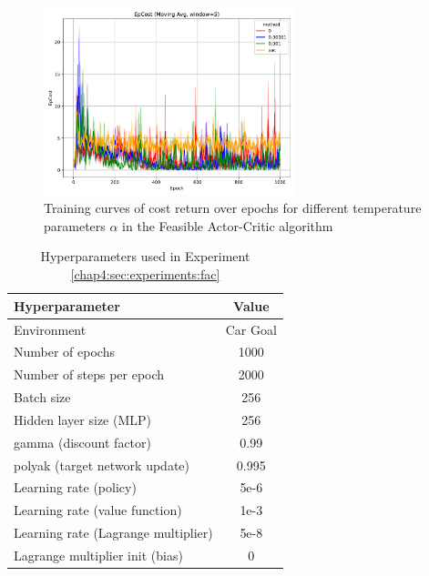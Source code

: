 \begin{figure}[h]
  \centering
  \includegraphics[width=0.65\textwidth]{imgs/chap4/fac/cost.pdf}
  \caption{Training curves of cost return over epochs for different temperature parameters $\alpha$ in the Feasible Actor-Critic algorithm}
  \label{chap4:fig:fac_cost}
\end{figure}

\clearpage

\begin{table}[h]
  \centering
  \caption{Hyperparameters used in Experiment \ref{chap4:sec:experiments:fac}}
  \label{tab:hyperparams-fac}
  \begin{tabular}{l c}
    \toprule
    \textbf{Hyperparameter} & \textbf{Value} \\
    \midrule
    Environment                         & Car Goal \\
    Number of epochs                    & 1000 \\
    Number of steps per epoch           & 2000 \\
    Batch size                          & 256 \\
    Hidden layer size (MLP)             & 256 \\
    gamma (discount factor)             & 0.99 \\
    polyak (target network update)      & 0.995 \\
    Learning rate (policy)              & 5e-6 \\
    Learning rate (value function)      & 1e-3 \\
    Learning rate (Lagrange multiplier) & 5e-8 \\
    Lagrange multiplier init (bias)     & 0 \\    
    \bottomrule
  \end{tabular}
\end{table}

